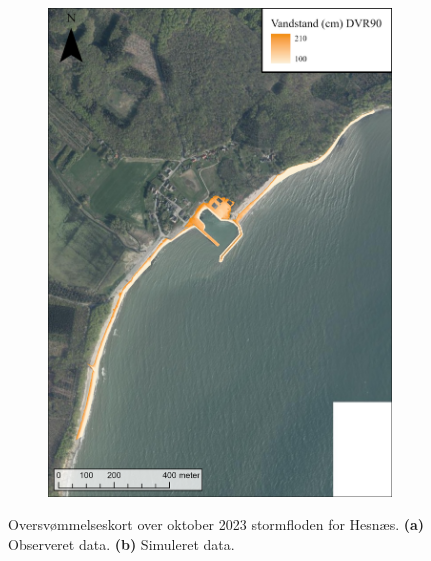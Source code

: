 \begin{figure}[H]
\begin{subfigure}[t]{0.5\textwidth}
        \includegraphics[width=0.95\linewidth]{images/Resultater/2023Model/2023 model_hesnaes.jpg}
        \caption{}
        \label{Subfig: Model Hesnæs}
    \end{subfigure}
    \caption{Oversvømmelseskort over oktober 2023 stormfloden for Hesnæs. \textbf{(a)} Observeret data. \textbf{(b)} Simuleret data.}
    \label{Figur: Målt & simuleret Hesnæs}
\end{figure} 

